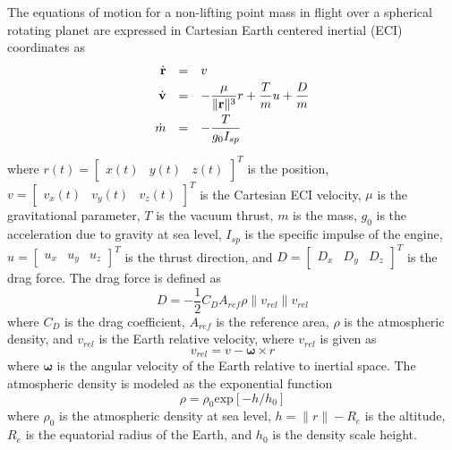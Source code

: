 \documentclass[10pt]{article}
\begin{document}
	The equations of motion for a non-lifting point mass in flight over a
	spherical rotating planet are expressed in Cartesian Earth centered inertial
	(ECI) coordinates as
	\begin{equation}\label{dyncs}
	\begin{array}{rcl}
	\dot{\textbf{r}} &=& { v} \vspace{3pt}\\
	\dot{\textbf{v}} &=& -\displaystyle\frac{\mu}{\|\textbf{r}\|^3}{ r} +
	\displaystyle\frac{T}{m}{ u} + \displaystyle\frac{{ D}}{m}  \vspace{3pt}\\
	\dot{m} & = & -\displaystyle\frac{T}{g_0I_{sp}}
	\vspace{3pt}\\
	\end{array}
	\end{equation}
	where ${ r}(t)=\left[\begin{array}{ccc} x(t) & y(t) & z(t)\end{array}\right]^T$
	is the position, ${ v} = \left[\begin{array}{ccc} v_x(t) & v_y(t) & v_z(t)\end{array}\right]^T$
	is the Cartesian ECI velocity, $\mu$ is the gravitational parameter, $T$ is
	the vacuum thrust, $m$ is the mass, $g_0$ is the acceleration due to gravity at sea level,
	$I_{sp}$ is the specific impulse of the engine,
	${ u} = \left[\begin{array}{ccc} u_x & u_y & u_z \end{array}\right]^T$ is the thrust
	direction, and ${ D}=\left[\begin{array}{ccc} D_x & D_y & D_z \end{array}\right]^T$
	is the drag force.  The drag force is defined as
	\begin{equation}
	{ D} = -\frac{1}{2}C_D A_{ref}\rho \|{ v}_{rel}\|{ v}_{rel}
	\end{equation}
	where $C_D$ is the drag coefficient, $A_{ref}$ is the reference area, $\rho$
	is the atmospheric density, and ${ v}_{rel}$ is the Earth relative
	velocity, where ${ v}_{rel}$ is given as
	\begin{equation}
	{ v}_{rel} = { v}-\boldsymbol{\omega} \times { r}
	\end{equation}
	where $\boldsymbol\omega$ is the angular velocity of the Earth relative to
	inertial space.  The atmospheric density is modeled as the exponential
	function
	\begin{equation}
	\rho = \rho_0\mbox{exp}[-h/h_0]
	\end{equation}
	where $\rho_0$ is the atmospheric density at sea level, $h=\| r\|-R_e$ is
	the altitude, $R_e$ is the equatorial radius of the Earth, and $h_0$ is the
	density scale height.  
\end{document}
